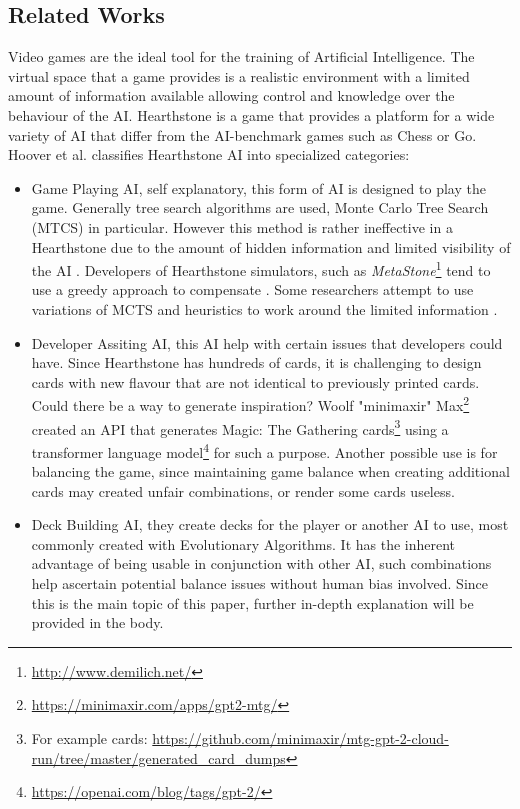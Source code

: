 \documentclass{report}
\begin{document}
\subsection{Related Works}
	Video games are the ideal tool for the training of Artificial Intelligence. The virtual space that a game provides is a realistic environment with a limited amount of information available \cite{Sweetser2002} allowing control and knowledge over the behaviour of the AI. Hearthstone is a game that provides a platform for a wide variety of AI that differ from the AI-benchmark games such as Chess or Go. Hoover et al. \cite{Hoover2019} classifies Hearthstone AI into specialized categories: 
\begin{itemize}
\item Game Playing AI, self explanatory, this form of AI is designed to play the game. Generally tree search algorithms are used, Monte Carlo Tree Search (MTCS) in particular. However this method is rather ineffective in a Hearthstone due to the amount of hidden information and limited visibility of the AI . Developers of Hearthstone simulators, such as {\it{MetaStone}}\footnote{\url{http://www.demilich.net/}} tend to use a greedy approach to compensate \cite{yannakakis2018artificial}. Some researchers attempt to use variations of MCTS and heuristics to work around the limited information \cite{Janusz2017}\cite{Miguel2017}\cite{Swiechowski2018}.
\item Developer Assiting AI, this AI help with certain issues that developers could have. Since Hearthstone has hundreds of cards, it is challenging to design cards with new flavour that are not identical to previously printed cards. Could there be a way to generate inspiration? Woolf "minimaxir" Max\footnote{\url{https://minimaxir.com/apps/gpt2-mtg/}} created an API that generates Magic: The Gathering cards\footnote{For example cards: \url{https://github.com/minimaxir/mtg-gpt-2-cloud-run/tree/master/generated_card_dumps}} using a transformer language model\footnote{\url{https://openai.com/blog/tags/gpt-2/}} for such a purpose. Another possible use is for balancing the game, since maintaining game balance when creating additional cards may created unfair combinations, or render some cards useless\cite{EvolveMeta}.
\item Deck Building AI, they create decks for the player or another AI to use, most commonly created with Evolutionary Algorithms\cite{Back1996}. It has the inherent advantage of being usable in conjunction with other AI, such combinations help ascertain potential balance issues without human bias involved. Since this is the main topic of this paper, further in-depth explanation will be provided in the body. 
\end{itemize}
\end{document}
